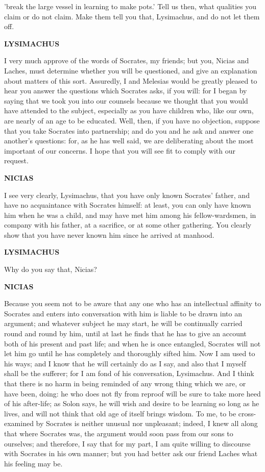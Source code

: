 \documentclass[11pt,letter]{article}
\begin{document}
'break the large vessel in learning to make pots.' Tell us then, what qualities you claim or do not claim. Make them tell you that, Lysimachus, and do not let them off.

\par \textbf{LYSIMACHUS}
\par   I very much approve of the words of Socrates, my friends; but you, Nicias and Laches, must determine whether you will be questioned, and give an explanation about matters of this sort. Assuredly, I and Melesias would be greatly pleased to hear you answer the questions which Socrates asks, if you will:  for I began by saying that we took you into our counsels because we thought that you would have attended to the subject, especially as you have children who, like our own, are nearly of an age to be educated. Well, then, if you have no objection, suppose that you take Socrates into partnership; and do you and he ask and answer one another's questions:  for, as he has well said, we are deliberating about the most important of our concerns. I hope that you will see fit to comply with our request.

\par \textbf{NICIAS}
\par   I see very clearly, Lysimachus, that you have only known Socrates' father, and have no acquaintance with Socrates himself:  at least, you can only have known him when he was a child, and may have met him among his fellow-wardsmen, in company with his father, at a sacrifice, or at some other gathering. You clearly show that you have never known him since he arrived at manhood.

\par \textbf{LYSIMACHUS}
\par   Why do you say that, Nicias?

\par \textbf{NICIAS}
\par   Because you seem not to be aware that any one who has an intellectual affinity to Socrates and enters into conversation with him is liable to be drawn into an argument; and whatever subject he may start, he will be continually carried round and round by him, until at last he finds that he has to give an account both of his present and past life; and when he is once entangled, Socrates will not let him go until he has completely and thoroughly sifted him. Now I am used to his ways; and I know that he will certainly do as I say, and also that I myself shall be the sufferer; for I am fond of his conversation, Lysimachus. And I think that there is no harm in being reminded of any wrong thing which we are, or have been, doing:  he who does not fly from reproof will be sure to take more heed of his after-life; as Solon says, he will wish and desire to be learning so long as he lives, and will not think that old age of itself brings wisdom. To me, to be cross-examined by Socrates is neither unusual nor unpleasant; indeed, I knew all along that where Socrates was, the argument would soon pass from our sons to ourselves; and therefore, I say that for my part, I am quite willing to discourse with Socrates in his own manner; but you had better ask our friend Laches what his feeling may be.
\end{document}
